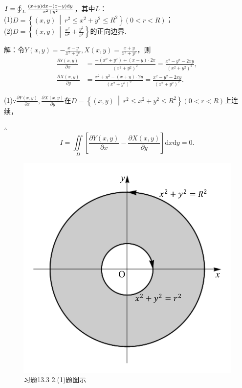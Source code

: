 \documentclass[12pt,UTF8]{ctexart}
\newcommand\Set[2]{\left\{#1\ \middle\vert\ #2 \right\}}
\newcommand{\varIInt}[4]{\iint\limits_{#1}#2\mathrm d#3\mathrm d#4}
\newcommand{\BLOInt}[2]{\varoint\nolimits_{#1}#2}
\begin{document}
\begin{enumerate}
$I=\BLOInt L{\frac{(x+y)\mathrm dx-(x-y)\mathrm dy}{x^2+y^2}}$，其中$L$：\\
(1)$D=\Set{(x,y)}{r^2\leqslant x^2+y^2\leqslant R^2}(0<r<R)$；\\
(2)$D=\Set{(x,y)}{\frac{x^2}{a^2}+\frac{y^2}{b^2}}$的正向边界.

解：令$Y(x,y)=-\frac{x-y}{x^2+y^2},X(x,y)=\frac{x+y}{x^2+y^2}$，则\[\begin{split}
\frac{\partial Y(x,y)}{\partial x}&=\frac{-(x^2+y^2)+(x-y)\cdot2x}{(x^2+y^2)^2}=\frac{x^2-y^2-2xy}{(x^2+y^2)^2},\\
\frac{\partial X(x,y)}{\partial y}&=\frac{x^2+y^2-(x+y)\cdot2y}{(x^2+y^2)^2}=\frac{x^2-y^2-2xy}{(x^2+y^2)^2}.
\end{split}\]

(1)$\because\frac{\partial Y(x,y)}{\partial x},\frac{\partial X(x,y)}{\partial y}$在$D=\Set{(x,y)}{r^2\leqslant x^2+y^2\leqslant R^2}(0<r<R)$上连续，

$\therefore$
\[I=\varIInt D{[\frac{\partial Y(x,y)}{\partial x}-\frac{\partial X(x,y)}{\partial y}]}xy=0.\]

\begin{figure}[H]
\begin{center}
\includegraphics[height=0.3\textheight]{Figures22/Fig13-3-2-1.pdf}
\end{center}
\caption{习题13.3 2.(1)题图示}
\label{13-3-2-1}
\end{figure}


\end{enumerate}
\end{document}
